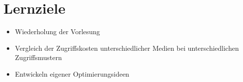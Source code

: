 \section*{Lernziele}
\begin{itemize}
	\item Wiederholung der Vorlesung
	\item Vergleich der Zugriffskosten unterschiedlicher Medien bei unterschiedlichen Zugriffsmustern
	\item Entwickeln eigener Optimierungsideen
\end{itemize}

